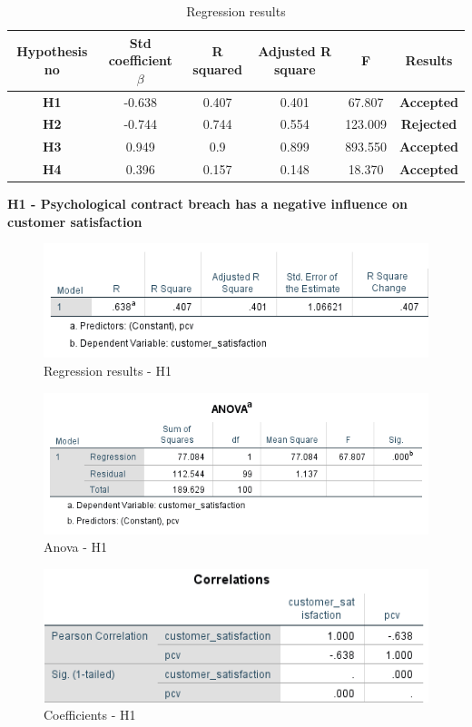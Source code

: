 \documentclass[a4paper, 12pt]{extarticle}
\begin{document}
{\begin{table}[H]
\centering
\begin{tabular}{|c|c|c|c|c|c|}
\hline
Hypothesis no & Std coefficient $\beta$  & R squared & Adjusted R square & F & Results \\
\hline
\textbf{H1} & -0.638 & 0.407 & 0.401 & 67.807 & \textbf{Accepted} \\
\hline
\textbf{H2} & -0.744 & 0.744 & 0.554 & 123.009 & \textbf{Rejected} \\
\hline
\textbf{H3} & 0.949 & 0.9 & 0.899 & 893.550 & \textbf{Accepted} \\
\hline
\textbf{H4} & 0.396 & 0.157 & 0.148 & 18.370 & \textbf{Accepted} \\
\hline 
\end{tabular}
\caption{Regression results}
\end{table}
\newpage
\par \textbf{H1 - Psychological contract breach has a negative influence on customer satisfaction}\\
\begin{figure}[H]
\centering
\includegraphics[scale=1]{pcv_vs_customer_satisfaction.png}
\caption{Regression results - H1}
\end{figure}

\begin{figure}[H]
\centering
\includegraphics[scale=1]{anova_pcv_cs.png}
\caption{Anova - H1}
\end{figure}

\begin{figure}[H]
\centering
\includegraphics[scale=1]{h1.png}
\caption{Coefficients - H1}
\end{figure}

}
\end{document}
